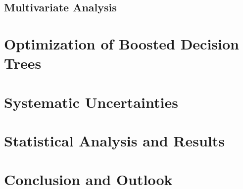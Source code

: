 \documentclass[12pt,a4paper,openright]{scrreprt}
\begin{document}
\section{Multivariate Analysis}
\label{sec:multivariate_analysis}

\chapter{Optimization of Boosted Decision Trees}
\label{cha:mva_strategy}

\chapter{Systematic Uncertainties}
\label{cha:systematic_uncertainties}

\chapter{Statistical Analysis and Results}
\label{cha:statistical_analysis_and_results}

\chapter{Conclusion and Outlook}
\label{cha:conclusion}

%
% 
% 
\end{document}
